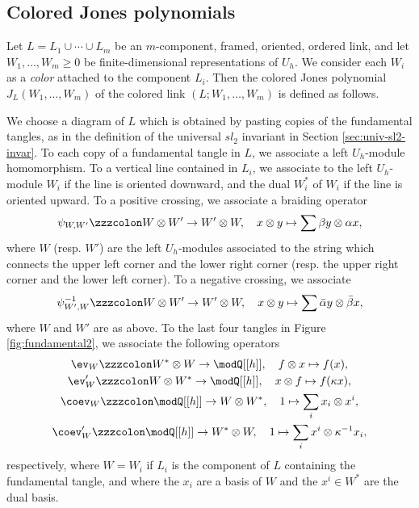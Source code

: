 \documentclass{amsart}
\numberwithin{equation}{section}
\numberwithin{figure}{section}
\theoremstyle{plain}
\theoremstyle{definition}
\theoremstyle{remark}
\begin{document}
\subsection{Colored Jones polynomials}
\label{sec:color-jones-polyn}

Let $L=L_1\cup \cdots\cup L_m$ be an $m$-component, framed, oriented, ordered
link, and let $W_1,\ldots,W_m\ge 0$ be finite-dimensional representations of
$U_h$.  We consider each $W_i$ as a {\em color} attached to the
component $L_i$.  Then the colored Jones polynomial $J_L(W_1,\ldots,W_m)$
of the colored link $(L;W_1,\ldots,W_m)$ is defined as follows.

We choose a diagram of $L$ which is obtained by pasting copies of the
fundamental tangles, as in the definition of the universal $sl_2$
invariant in Section \ref{sec:univ-sl2-invar}.  To each copy of a
fundamental tangle in $L$, we associate a left $U_h$-module
homomorphism.  To a vertical line contained in $L_i$, we associate to
the left $U_h$-module $W_i$ if the line is oriented downward, and the
dual $W_i^*$ of $W_i$ if the line is oriented upward.  To a positive
crossing, we associate a braiding operator
\begin{equation*}
  \psi _{W,W'}\zzzcolon W\otimes W'\rightarrow W'\otimes W, \quad x\otimes y\mapsto \sum\beta y\otimes \alpha x,
\end{equation*}
where $W$ (resp. $W'$) are the left $U_h$-modules associated to the
string which connects the upper left corner and the lower right corner
(resp. the upper right corner and the lower left corner).  To a
negative crossing, we associate
\begin{equation*}
  \psi _{W',W}^{-1}\zzzcolon W\otimes W'\rightarrow W'\otimes W, \quad x\otimes y\mapsto \sum\bar\alpha y\otimes \bar\beta x,
\end{equation*}
where $W$ and $W'$ are as above.  To the last four tangles in Figure
\ref{fig:fundamental2}, we associate the following operators
\begin{gather*}
  \ev_{W}\zzzcolon W^*\otimes W\rightarrow \modQ [[h]], \quad f\otimes x\mapsto f(x),\\
  \ev'_{W}\zzzcolon W\otimes W^*\rightarrow \modQ [[h]], \quad x\otimes f\mapsto f(\kappa x),\\
  \coev_{W}\zzzcolon \modQ [[h]]\rightarrow W\otimes W^*, \quad 1\mapsto \sum_ix_i\otimes x^i,\\
  \coev'_{W}\zzzcolon \modQ [[h]]\rightarrow W^*\otimes W, \quad 1\mapsto \sum_ix^i\otimes \kappa ^{-1}x_i,
\end{gather*}
respectively, where $W=W_i$ if $L_i$ is the component of $L$
containing the fundamental tangle, and where the $x_i$ are a basis of
$W$ and the $x^i\in W^*$ are the dual basis.
\end{document}
